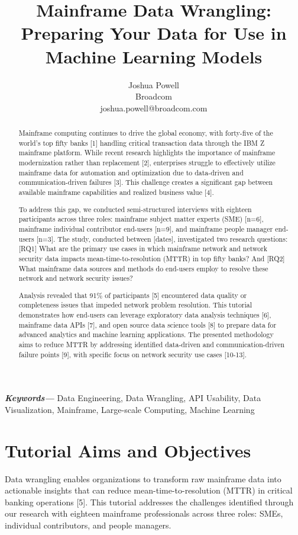 \documentclass[a4paper]{article}
\title{Mainframe Data Wrangling: Preparing Your Data for Use in Machine Learning Models }
\author{Joshua Powell \\
        \small Broadcom \\
        \small joshua.powell@broadcom.com \\
}
\date{} %
\providecommand{\keywords}[1]
{
  \small	
  \textbf{\textit{Keywords---}} #1
}
\begin{document}
\maketitle

\begin{abstract}
    Mainframe computing continues to drive the global economy, with forty-five of the world's top fifty banks [1] handling critical transaction data through the IBM Z mainframe platform. While recent research highlights the importance of mainframe modernization rather than replacement [2], enterprises struggle to effectively utilize mainframe data for automation and optimization due to data-driven and communication-driven failures [3]. This challenge creates a significant gap between available mainframe capabilities and realized business value [4].

    To address this gap, we conducted semi-structured interviews with eighteen participants across three roles: mainframe subject   matter experts (SME) [n=6], mainframe individual contributor end-users [n=9], and mainframe people manager end-users [n=3]. The study, conducted between [dates], investigated two research questions: [RQ1] What are the primary use cases in which mainframe network and network security data impacts mean-time-to-resolution (MTTR) in top fifty banks? And [RQ2] What mainframe data sources and methods do end-users employ to resolve these network and network security issues?
    
    Analysis revealed that 91\% of participants [5] encountered data quality or completeness issues that impeded network problem resolution. This tutorial demonstrates how end-users can leverage exploratory data analysis techniques [6], mainframe data APIs [7], and open source data science tools [8] to prepare data for advanced analytics and machine learning applications. The presented methodology aims to reduce MTTR by addressing identified data-driven and communication-driven failure points [9], with specific focus on network security use cases [10-13].
\end{abstract}

\keywords{Data Engineering, Data Wrangling, API Usability, Data Visualization, Mainframe, Large-scale Computing, Machine Learning}

\section{Tutorial Aims and Objectives}
    Data wrangling enables organizations to transform raw mainframe data into actionable insights that can reduce mean-time-to-resolution (MTTR) in critical banking operations [5]. This tutorial addresses the challenges identified through our research with eighteen mainframe professionals across three roles: SMEs, individual contributors, and people managers.
\end{document}
